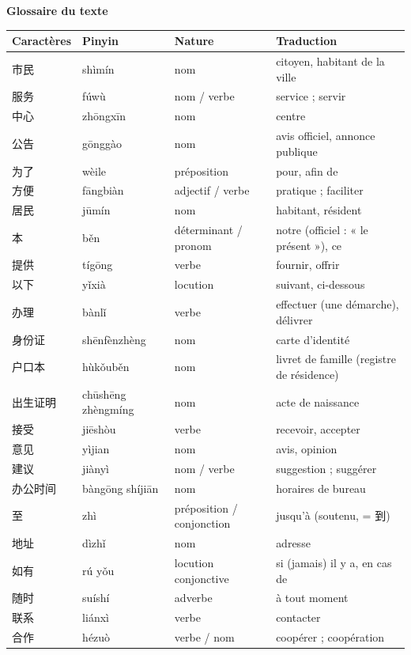 \documentclass[11pt]{article}
\begin{document}
\textbf{Glossaire du texte}

\begin{center}
\begin{tabularx}{\linewidth}{|X|X|X|X|}
\hline
\rowcolor{popblueL} Caractères & Pinyin & Nature & Traduction \\
\hline
市民 & shìmín & nom & citoyen, habitant de la ville \\
\hline
服务 & fúwù & nom / verbe & service ; servir \\
\hline
中心 & zhōngxīn & nom & centre \\
\hline
公告 & gōnggào & nom & avis officiel, annonce publique \\
\hline
为了 & wèile & préposition & pour, afin de \\
\hline
方便 & fāngbiàn & adjectif / verbe & pratique ; faciliter \\
\hline
居民 & jūmín & nom & habitant, résident \\
\hline
本 & běn & déterminant / pronom & notre (officiel : « le présent »), ce \\
\hline
提供 & tígōng & verbe & fournir, offrir \\
\hline
以下 & yǐxià & locution & suivant, ci-dessous \\
\hline
办理 & bànlǐ & verbe & effectuer (une démarche), délivrer \\
\hline
身份证 & shēnfènzhèng & nom & carte d'identité \\
\hline
户口本 & hùkǒuběn & nom & livret de famille (registre de résidence) \\
\hline
出生证明 & chūshēng zhèngmíng & nom & acte de naissance \\
\hline
接受 & jiēshòu & verbe & recevoir, accepter \\
\hline
意见 & yìjian & nom & avis, opinion \\
\hline
建议 & jiànyì & nom / verbe & suggestion ; suggérer \\
\hline
办公时间 & bàngōng shíjiān & nom & horaires de bureau \\
\hline
至 & zhì & préposition / conjonction & jusqu'à (soutenu, = 到) \\
\hline
地址 & dìzhǐ & nom & adresse \\
\hline
如有 & rú yǒu & locution conjonctive & si (jamais) il y a, en cas de \\
\hline
随时 & suíshí & adverbe & à tout moment \\
\hline
联系 & liánxì & verbe & contacter \\
\hline
合作 & hézuò & verbe / nom & coopérer ; coopération \\
\hline
\end{tabularx}
\end{center}
\end{document}
